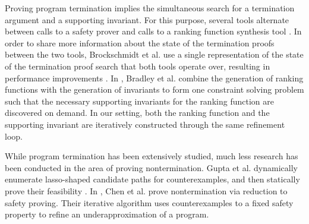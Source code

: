 \documentclass[preprint]{sigplanconf}
\theoremstyle{definition}
\begin{document}
Proving program termination implies the simultaneous search for a termination argument and a supporting invariant.
For this purpose, several tools alternate 
between calls to a safety prover and calls to a ranking function synthesis tool \cite{}. 
In order to share more information about the state of the termination proofs between the two tools, 
Brockschmidt et al. use a single representation of the state of the termination proof search that both tools operate over, 
resulting in performance improvements \cite{DBLP:conf/cav/BrockschmidtCF13}.
In \cite{DBLP:conf/cav/BradleyMS05}, Bradley et al. combine the generation of ranking functions with the generation of invariants to
form one constraint solving problem such that the necessary supporting invariants for the ranking function are discovered on demand.
In our setting, both the ranking function and the supporting invariant are iteratively constructed through the same refinement loop.

 






While program termination has been extensively studied, much less research has been conducted in the area of proving nontermination.
Gupta et al. dynamically enumerate lasso-shaped candidate
paths for counterexamples, and then statically prove their feasibility \cite{DBLP:conf/popl/GuptaHMRX08}. 
In \cite{DBLP:conf/tacas/ChenCFNO14}, Chen et al. prove nontermination via
reduction to safety proving. Their iterative algorithm uses counterexamples to a fixed safety property
to refine an underapproximation of a program. 
\end{document}
